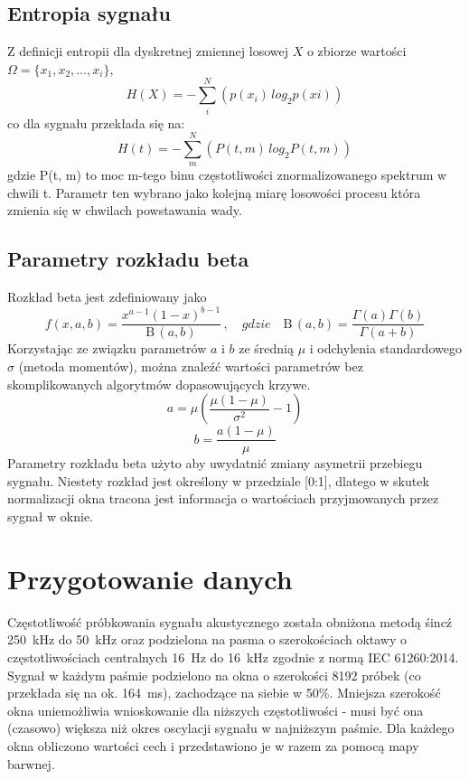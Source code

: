 \documentclass{mwart}
\begin{document}
\subsection{Entropia sygnału}
    Z definicji entropii dla dyskretnej zmiennej losowej $X$ o zbiorze wartości $\Omega = \{x_1, x_2, \dots , x_i\}$, 
    \begin{equation}
        H(X) = - \sum_i^N \left( p(x_i) \, log_2 p(xi) \right)
    \end{equation}co dla sygnału przekłada się na:
    \begin{equation}
        H(t) = -\sum_m^N \left( P(t, m) \, log_2P(t, m) \right)
    \end{equation}gdzie P(t, m) to moc m-tego binu częstotliwości znormalizowanego spektrum w chwili t.
    Parametr ten wybrano jako kolejną miarę losowości procesu która zmienia się w chwilach powstawania wady.
\subsection{Parametry rozkładu beta}
Rozkład beta jest zdefiniowany jako
\begin{equation}
    f(x, a, b) = \frac{x^{a-1}(1-x)^{b-1}}{\mathrm{B}\,(a, b)}\,,\quad gdzie \quad \mathrm{B}\, (a, b) = \frac{\Gamma(a)\Gamma(b)}{\Gamma(a+b)}
\end{equation}Korzystając ze związku parametrów $a$ i $b$ ze średnią $\mu$ i odchylenia standardowego $\sigma$ (metoda momentów), można znaleźć wartości parametrów bez skomplikowanych algorytmów dopasowujących krzywe.
\begin{equation}
a = \mu \left( \frac{\mu(1-\mu)}{\sigma^2} -1 \right)
\end{equation}
\begin{equation}
b = \frac{a(1-\mu)}{\mu}
\end{equation}
Parametry rozkładu beta użyto aby uwydatnić zmiany asymetrii  przebiegu sygnału. Niestety rozkład jest określony w przedziale [0:1], dlatego w skutek normalizacji okna tracona jest informacja o wartościach przyjmowanych przez sygnał w oknie.
\section{Przygotowanie danych}
Częstotliwość próbkowania sygnału akustycznego została obniżona metodą \'sinc\' z 250~kHz do 50~kHz oraz podzielona na pasma o szerokościach oktawy o częstotliwościach centralnych 16~Hz do 16~kHz zgodnie z normą IEC 61260:2014. Sygnał w każdym paśmie podzielono na okna o szerokości 8192 próbek (co przekłada się na ok. 164~ms), zachodzące na siebie w 50\%. Mniejsza szerokość okna uniemożliwia wnioskowanie dla niższych częstotliwości - musi być ona (czasowo) większa niż okres oscylacji sygnału w najniższym paśmie. Dla każdego okna obliczono wartości cech i przedstawiono je w razem za pomocą mapy barwnej.
\end{document}
